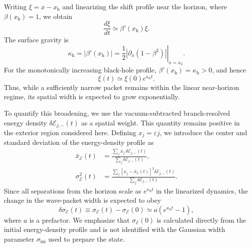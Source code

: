 \documentclass[reprint,amsmath,amssymb,aps,prb,showkeys,superscriptaddress]{revtex4-2}
\begin{document}
Writing $\xi=x-x_{\mathrm h}$ and linearizing the shift profile
near the horizon, where $\beta(x_{\mathrm h})=1$, we obtain
\begin{equation}
  \frac{d\xi}{dt}
  \simeq
  \beta'(x_{\mathrm h})\xi.
  \label{eq:near_horizon_linearization}
\end{equation}
The surface gravity is
\begin{equation}
  \kappa_{\mathrm h}
  =
  \left|
    \beta'(x_{\mathrm h})
  \right|
  =
  \left.
  \frac{1}{2}
  \left|
    \partial_x\left(1-\beta^2\right)
  \right|
  \right|_{x=x_{\mathrm h}}.
  \label{eq:surface_gravity}
\end{equation}
For the monotonically increasing black-hole profile,
$\beta'(x_{\mathrm h})=\kappa_{\mathrm h}>0$, and hence
\begin{equation}
  \xi(t)
  \simeq
  \xi(0)e^{\kappa_{\mathrm h}t}.
  \label{eq:near_horizon_separation}
\end{equation}
Thus, while a sufficiently narrow packet remains within the
linear near-horizon regime, its spatial width is expected to grow
exponentially.

To quantify this broadening, we use the vacuum-subtracted
branch-resolved energy density
$\delta\mathcal{E}_{j,-}(t)$ as a spatial weight. This quantity
remains positive in the exterior region considered here. Defining
$x_j=\varepsilon j$, we introduce the center and standard deviation
of the energy-density profile as
\begin{align}
  \bar{x}_{\mathcal E}(t)
  &=
  \frac{
    \displaystyle
    \sum_j
    x_j\,
    \delta\mathcal{E}_{j,-}(t)
  }{
    \displaystyle
    \sum_j
    \delta\mathcal{E}_{j,-}(t)
  },
  \label{eq:energy_center}
  \\
  \sigma_{\mathcal E}^2(t)
  &=
  \frac{
    \displaystyle
    \sum_j
    \left[
      x_j-\bar{x}_{\mathcal E}(t)
    \right]^2
    \delta\mathcal{E}_{j,-}(t)
  }{
    \displaystyle
    \sum_j
    \delta\mathcal{E}_{j,-}(t)
  }.
  \label{eq:energy_width}
\end{align}
Since all separations from the horizon scale as
$e^{\kappa_{\mathrm h}t}$ in the linearized dynamics, the change in
the wave-packet width is expected to obey
\begin{equation}
  \delta\sigma_{\mathcal E}(t)
  \equiv
  \sigma_{\mathcal E}(t)
  -
  \sigma_{\mathcal E}(0)
  \simeq
  a\left(
    e^{\kappa_{\mathrm h}t}-1
  \right),
  \label{eq:sigma_kappa}
\end{equation}
where $a$ is a prefactor. We emphasize that
$\sigma_{\mathcal E}(0)$ is calculated directly from the initial
energy-density profile and is not identified with the Gaussian
width parameter $\sigma_{\mathrm{ini}}$ used to prepare the state.
\end{document}
